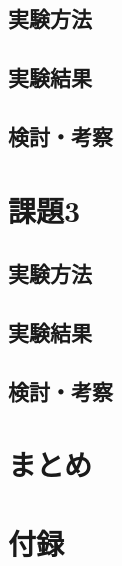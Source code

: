 \documentclass[12pt]{jarticle}
\begin{document}
\subsection{実験方法}
\subsection{実験結果}
\subsection{検討・考察}

\section{課題3}
\subsection{実験方法}
\subsection{実験結果}
\subsection{検討・考察}


\clearpage

\section{まとめ}



\begin{thebibliography}{99}

\end{thebibliography}

\clearpage
\appendix
\section{付録}




\end{document}
